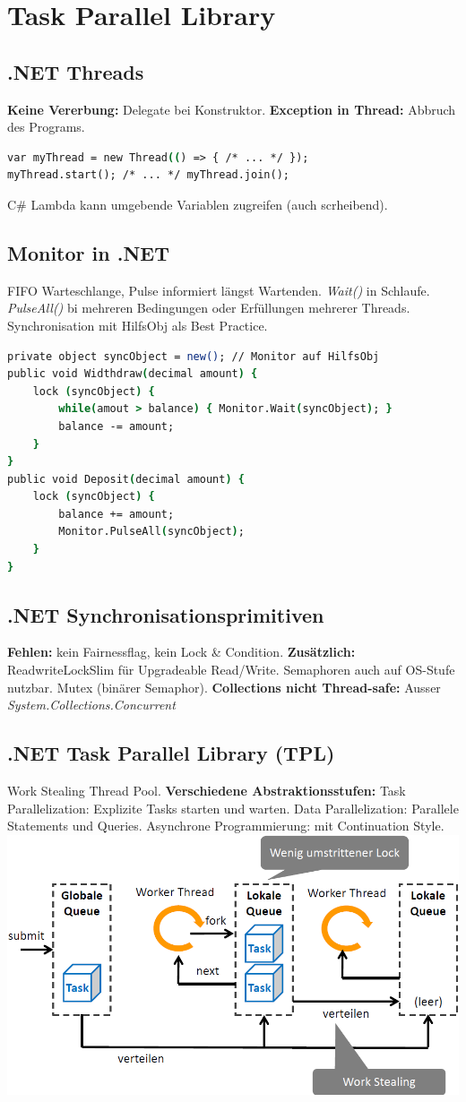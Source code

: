 \section{Task Parallel Library}
\subsection{.NET Threads}
\textbf{Keine Vererbung:} Delegate bei Konstruktor.
\textbf{Exception in Thread:} Abbruch des Programs.
\begin{lstlisting}[language=csh]
var myThread = new Thread(() => { /* ... */ });
myThread.start(); /* ... */ myThread.join();
\end{lstlisting}
C\# Lambda kann umgebende Variablen zugreifen (auch scrheibend).

\subsection{Monitor in .NET}
FIFO Warteschlange, Pulse informiert längst Wartenden. \textit{Wait()} in Schlaufe.
\textit{PulseAll()} bi mehreren Bedingungen oder Erfüllungen mehrerer Threads.
Synchronisation mit HilfsObj als Best Practice.
\begin{lstlisting}[language=csh]
private object syncObject = new(); // Monitor auf HilfsObj
public void Widthdraw(decimal amount) {
    lock (syncObject) {
        while(amout > balance) { Monitor.Wait(syncObject); }
        balance -= amount;
    }
}
public void Deposit(decimal amount) {
    lock (syncObject) {
        balance += amount;
        Monitor.PulseAll(syncObject);
    }
}
\end{lstlisting}

\subsection{.NET Synchronisationsprimitiven}
\textbf{Fehlen:} kein Fairnessflag, kein Lock \& Condition.
\textbf{Zusätzlich:} ReadwriteLockSlim für Upgradeable Read/Write. Semaphoren auch auf OS-Stufe nutzbar.
Mutex (binärer Semaphor).
\textbf{Collections nicht Thread-safe:} Ausser \textit{System.Collections.Concurrent}

\subsection{.NET Task Parallel Library (TPL)}
Work Stealing Thread Pool. 
\textbf{Verschiedene Abstraktionsstufen:} Task Parallelization: Explizite Tasks starten und warten.
Data Parallelization: Parallele Statements und Queries.
Asynchrone Programmierung: mit Continuation Style.
\includegraphics[width=0.7\linewidth]{img/work_stealing_thread_pool.png}


